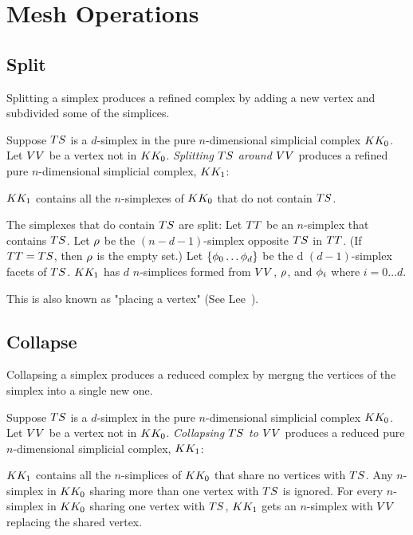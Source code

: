 
\section{Mesh Operations}
\label{sec:mesh-operations}

\subsection{Split}

Splitting a simplex produces a refined complex by adding a new vertex
and subdivided some of the simplices.


Suppose $T{S}$ is a $d$-simplex
in the pure $n$-dimensional simplicial complex $K{K}_0$.
Let $V{V}$ be a vertex not in $K{K}_0$.
{\it Splitting $T{S}$ around $V{V}$}
produces a refined pure $n$-dimensional simplicial complex, $K{K}_1$:

$K{K}_1$ contains all the  $n$-simplexes of $K{K}_0$
that do not contain $T{S}$.

The simplexes that do contain $T{S}$ are split:
Let $T{T}$ be an $n$-simplex that contains $T{S}$.
Let $\rho$ be the $(n-d-1)$-simplex opposite $T{S}$
in $T{T}$.
(If $T{T} = T{S}$, then $\rho$ is the empty set.)
Let $\{ \phi_0 \ldots \phi_d \}$ be the
d $(d-1)$-simplex facets of $T{S}$.
$K{K}_1$ has
$d$ $n$-simplices formed from
$V{V}$, $\rho$, and
$\phi_i$ where $i=0 \ldots d$.

This is also known as "placing a vertex" 
(See Lee~\cite[sec.~17.2]{lee-hdcg-17-2004}).

\subsection{Collapse}

Collapsing a simplex produces a reduced complex by mergng
the vertices of the simplex into a single new one.

Suppose $T{S}$ is a $d$-simplex
in the pure $n$-dimensional simplicial complex $K{K}_0$.
Let $V{V}$ be a vertex not in $K{K}_0$.
{\it Collapsing $T{S}$ to $V{V}$}
produces a reduced pure $n$-dimensional simplicial complex, $K{K}_1$:

$K{K}_1$ contains all the
$n$-simplices of $K{K}_0$ that share no vertices with $T{S}$.
Any $n$-simplex in $K{K}_0$ sharing more than one vertex
with $T{S}$ is ignored.
For every $n$-simplex in $K{K}_0$ sharing one vertex with $T{S}$,
$K{K}_1$ gets an $n$-simplex with $V{V}$ replacing the
shared vertex.

